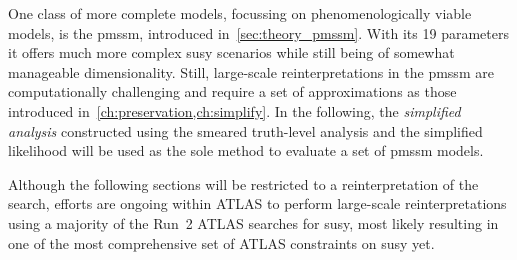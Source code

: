 One class of more complete models, focussing on phenomenologically viable models, is the \gls{pmssm}, introduced in~\cref{sec:theory_pmssm}.
With its 19 parameters it offers much more complex \gls{susy} scenarios while still being of somewhat manageable dimensionality.
Still, large-scale reinterpretations in the \gls{pmssm} are computationally challenging and require a set of approximations as those introduced in~\cref{ch:preservation,ch:simplify}.
In the following, the \textit{simplified analysis} constructed using the smeared truth-level analysis and the simplified likelihood will be used as the sole method to evaluate a set of \gls{pmssm} models.

Although the following sections will be restricted to a reinterpretation of the \onelepton search, efforts are ongoing within ATLAS to perform large-scale reinterpretations using a majority of the Run~2 ATLAS searches for \gls{susy}, most likely resulting in one of the most comprehensive set of ATLAS constraints on \gls{susy} yet.




